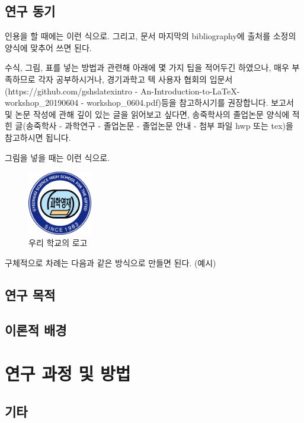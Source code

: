 \documentclass[10pt]{gshs-report-v2.0}
\begin{document}
\subsection{연구 동기}
인용을 할 때에는 이런 식으로. \cite{danhaeng2003} 그리고, 문서 마지막의 bibliography에 출처를 소정의 양식에 맞추어 쓰면 된다. \cite{nonmoon2021, hagwi2010, websearch2020}

 수식, 그림, 표를 넣는 방법과 관련해 아래에 몇 가지 팁을 적어두긴 하였으나, 매우 부족하므로 각자 공부하시거나, 경기과학고 텍 사용자 협회의 입문서 \\ (https://github.com/gshslatexintro - An-Introduction-to-\LaTeX - workshop\_20190604 - workshop\_0604.pdf)등을 참고하시기를 권장합니다. 보고서 및 논문 작성에 관해 깊이 있는 글을 읽어보고 싶다면, 송죽학사의 졸업논문 양식에 적힌 글(송죽학사 - 과학연구 - 졸업논문 - 졸업논문 안내 - 첨부 파일 hwp 또는 tex)을 참고하시면 됩니다.

그림을 넣을 때는 이런 식으로.
\begin{figure}[h]
\centering
\includegraphics[width=0.25\textwidth]{gshs.jpg} %
\caption{우리 학교의 로고}
\label{fig:logo}
\end{figure}

구체적으로 차례는 다음과 같은 방식으로 만들면 된다. (예시)

\subsection{연구 목적}

\subsection{이론적 배경}


\section{연구 과정 및 방법}
\subsection{기타}
\end{document}
